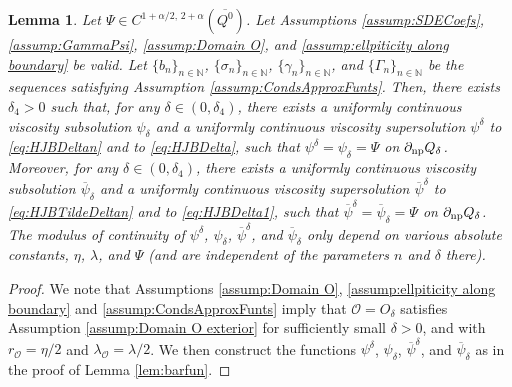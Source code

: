 \documentclass[amscd,amssymb,11pt]{article}
\newtheorem{lemma}[theorem]{Lemma}
\numberwithin{theorem}{section}
\numberwithin{equation}{section}
\begin{document}
\begin{lemma}\label{lem:barfun1}
Let $\Psi\in C^{1+\alpha/2,\,2+\alpha}(\overline{Q^{0}})$. Let Assumptions \ref{assump:SDECoefs}, \ref{assump:GammaPsi}, \ref{assump:Domain O}, and \ref{assump:ellpiticity along boundary} be valid. Let $\{b_{n}\}_{n\in\mathbb{N}}$, $\{\sigma_{n}\}_{n\in\mathbb{N}}$, $\{\gamma_{n}\}_{n\in\mathbb{N}}$, and $\{\Gamma_n\}_{n\in\mathbb{N}}$ be the sequences satisfying Assumption \ref{assump:CondsApproxFunts}. Then, there exists $\delta_{4}>0$ such that, for any $\delta\in(0,\delta_{4})$, there exists a uniformly continuous viscosity subsolution $\psi_{\delta}$ and a uniformly continuous viscosity supersolution $\psi^{\delta}$ to \eqref{eq:HJBDeltan} and to \eqref{eq:HJBDelta}, such that $\psi^{\delta}=\psi_{\delta}=\Psi$ on $\partial_{{\rm np}}Q_{\delta}$. Moreover, for any $\delta\in(0,\delta_{4})$, there exists a uniformly continuous viscosity subsolution $\overline{\psi}_{\delta}$ and a uniformly continuous viscosity supersolution $\overline{\psi}^{\delta}$ to \eqref{eq:HJBTildeDeltan} and to \eqref{eq:HJBDelta1}, such that $\overline{\psi}^{\delta}=\overline{\psi}_{\delta}=\Psi$ on $\partial_{{\rm np}} Q_{\delta}$. The modulus of continuity of $\psi^{\delta}$, $\psi_{\delta}$, $\overline{\psi}^{\delta}$, and $\overline{\psi}_{\delta}$ only depend on various absolute constants, $\eta$, $\lambda$, and $\Psi$ (and are independent of the parameters $n$ and $\delta$ there).
\end{lemma}
\begin{proof}
We note that Assumptions \ref{assump:Domain O}, \ref{assump:ellpiticity along boundary} and \ref{assump:CondsApproxFunts} imply that $\mathscr{O}=O_{\delta}$ satisfies Assumption \ref{assump:Domain O exterior} for sufficiently small $\delta>0$, and with $r_{\mathscr{O}}=\eta/2$ and $\lambda_{\mathscr{O}}=\lambda/2$. We then construct the functions $\psi^{\delta}$, $\psi_{\delta}$, $\overline{\psi}^{\delta}$, and $\overline{\psi}_{\delta}$ as in the proof of Lemma \ref{lem:barfun}.
\end{proof}
\end{document}
